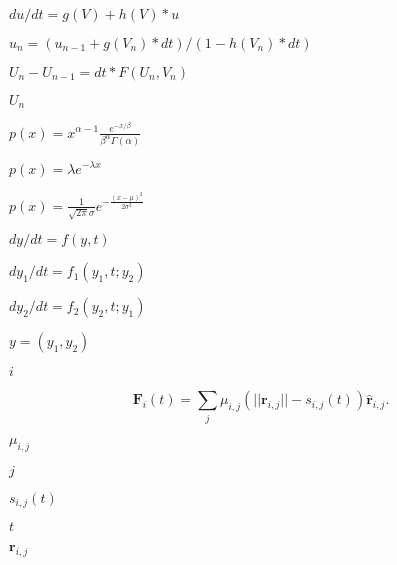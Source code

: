 \documentclass{article}
\begin{document}
$du/dt = g(V) + h(V)*u$
\pagebreak

$u_n = ( u_{n-1} + g(V_n)*dt ) / ( 1 - h(V_n)*dt )$
\pagebreak

$U_n - U_{n-1} = dt*F(U_n, V_n)$
\pagebreak

$U_n$
\pagebreak

$\displaystyle p(x) = x^{\alpha-1}\frac{e^{-x/\beta}}{\beta^\alpha\Gamma(\alpha)}$
\pagebreak

$\displaystyle p(x) = \lambda e^{-\lambda x}$
\pagebreak

$\displaystyle p(x) =
  \frac{1}{\sqrt{2\pi}\sigma} e^{-\frac{(x-\mu)^2}{2\sigma^2}}
$
\pagebreak

$dy/dt = f(y, t)$
\pagebreak

$dy_1/dt = f_1(y_1, t; y_2)$
\pagebreak

$dy_2/dt = f_2(y_2, t; y_1)$
\pagebreak

$y = (y_1, y_2)$
\pagebreak

$i$
\pagebreak

\[
\mathbf{F}_{i}(t) = \sum_{j} \mu_{i,j} ( || \mathbf{r}_{i,j} || - s_{i,j}(t) ) \hat{\mathbf{r}}_{i,j}.
\]
\pagebreak

$\mu_{i,j}$
\pagebreak

$j$
\pagebreak

$s_{i,j}(t)$
\pagebreak

$t$
\pagebreak

$\mathbf{r}_{i,j}$
\pagebreak

$\hat{}$
\pagebreak
\end{document}
